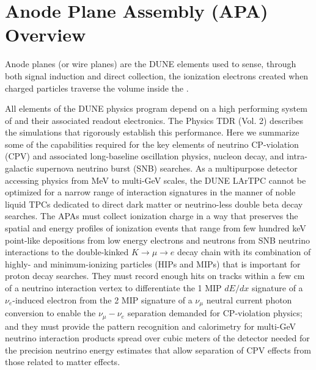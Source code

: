 \section{Anode Plane Assembly (APA) Overview}
\label{sec:fdsp-apa-intro}

Anode planes (or wire planes) are the DUNE  elements used to sense, through both signal induction and direct collection, the ionization electrons created when charged particles traverse the \lar volume inside the . 


All elements of the DUNE physics program depend on a high performing system of  and their associated readout electronics.  The Physics TDR (Vol. 2) describes the simulations that rigorously establish this performance.  Here we summarize some of the  capabilities required for the key elements of neutrino CP-violation (CPV) and associated long-baseline oscillation physics, nucleon decay, and intra-galactic supernova neutrino burst (SNB) searches.  As a multipurpose detector accessing physics from MeV to multi-GeV scales, the DUNE LArTPC cannot be optimized for a narrow range of interaction signatures in the manner of noble liquid TPCs dedicated to direct dark matter or neutrino-less double beta decay searches.  The APAs must collect ionization charge in a way that preserves the spatial and energy profiles of ionization events that range from few hundred keV point-like depositions from low energy electrons and neutrons  from SNB neutrino interactions to the double-kinked $K\rightarrow\mu\rightarrow{e}$ decay chain with its combination of highly- and minimum-ionizing particles (HIPs and MIPs) that is important for proton decay searches.  They must record enough hits on tracks within a few cm of a neutrino interaction vertex to differentiate the 1 MIP $dE/dx$ signature of a $\nu_e$-induced electron from the 2 MIP signature of a $\nu_\mu$ neutral current photon conversion to enable the $\nu_\mu-\nu_e$ separation demanded for CP-violation physics; and they must provide the pattern recognition and calorimetry for multi-GeV neutrino interaction products  spread over cubic meters of the detector needed for the precision neutrino energy estimates that allow separation of CPV effects from those related to matter effects. 
 
